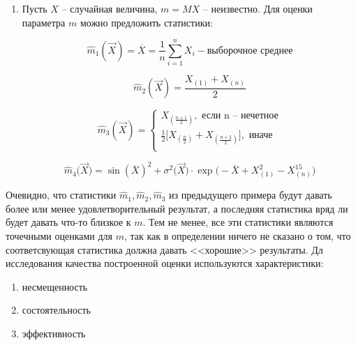 \begin{example}
    \begin{enumerate}
        \item Пусть $X$ -- случайная величина, $m = MX$ -- неизвестно.
            Для оценки параметра $m$ можно предложить статистики:

            \begin{equation*}
                \hat m_1 (\vec X) = \overline{X} =
                \frac{1}{n} \sum_{i=1}^n X_i - \text{выборочное среднее}
            \end{equation*}

            \begin{equation*}
                \hat m_2 (\vec X) = \frac{X_{(1)} + X_{(n)}}{2}
            \end{equation*}

            \begin{equation*}
                \hat m_3 (\vec X) =
                \begin{cases}
                    X_{(\frac{n+1}{2})}, \text{ если n -- нечетное} \\
                    \frac{1}{2} \bigg[ X_{(\frac{n}{2})} +
                    X_{(\frac{n+2}{2})}\bigg], \text{ иначе} \\
                \end{cases}
            \end{equation*}

            \begin{equation*}
                \hat m_4 \big(\vec X\big) = \sin(\overline X)^2 +
                \sigma^2 \big(\vec X\big) \cdot
                \exp \big( -\overline X + X^2_{(1)} - X^{15}_{(n)} \big)
            \end{equation*}
    \end{enumerate}
\end{example}

Очевидно, что статистики
$\hat m_1, \hat m_2, \hat m_3$ из предыдущего примера будут
давать более или менее удовлетворительный результат, а последняя
статистика вряд ли будет давать что-то близкое к $m$. Тем не менее,
все эти статистики являются точечными оценками для $m$, так как
в определении ничего не сказано о том, что соответсвующая статистика
должна давать <<хорошие>> результаты. Дл исследования
качества построенной оценки используются характеристики:

\begin{enumerate}
    \item несмещенность
    \item состоятельность
    \item эффективность
\end{enumerate}

